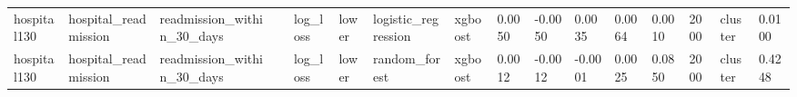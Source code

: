 \begin{tabular}{llllllllllllllll}
hospital130 & hospital\_readmission & readmission\_within\_30\_days &  & log\_loss & lower & logistic\_regression & xgboost & 0.0050 & -0.0050 & 0.0035 & 0.0064 & 0.0010 & 2000 & cluster & 0.0100 \\
hospital130 & hospital\_readmission & readmission\_within\_30\_days &  & log\_loss & lower & random\_forest & xgboost & 0.0012 & -0.0012 & -0.0001 & 0.0025 & 0.0850 & 2000 & cluster & 0.4248 \\
\hline
\end{tabular}
